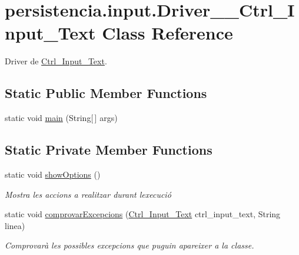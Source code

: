 \hypertarget{classpersistencia_1_1input_1_1Driver____Ctrl__Input__Text}{}\section{persistencia.\+input.\+Driver\+\_\+\+\_\+\+Ctrl\+\_\+\+Input\+\_\+\+Text Class Reference}
\label{classpersistencia_1_1input_1_1Driver____Ctrl__Input__Text}


Driver de \hyperlink{classpersistencia_1_1input_1_1Ctrl__Input__Text}{Ctrl\+\_\+\+Input\+\_\+\+Text}.  


\subsection*{Static Public Member Functions}
\begin{DoxyCompactItemize}
\item 
static void \hyperlink{classpersistencia_1_1input_1_1Driver____Ctrl__Input__Text_a38cebd4cadb9198cb6a2c87147646ec0}{main} (String\mbox{[}$\,$\mbox{]} args)
\end{DoxyCompactItemize}
\subsection*{Static Private Member Functions}
\begin{DoxyCompactItemize}
\item 
static void \hyperlink{classpersistencia_1_1input_1_1Driver____Ctrl__Input__Text_a51d02aa85468b0924d13e4060106459e}{show\+Options} ()
\begin{DoxyCompactList}\small\item\em Mostra les accions a realitzar durant l\textquotesingle{}execució \end{DoxyCompactList}\item 
static void \hyperlink{classpersistencia_1_1input_1_1Driver____Ctrl__Input__Text_a3e4149adb11b97b330ce77f1c2b5ae9c}{comprovar\+Excepcions} (\hyperlink{classpersistencia_1_1input_1_1Ctrl__Input__Text}{Ctrl\+\_\+\+Input\+\_\+\+Text} ctrl\+\_\+input\+\_\+text, String linea)
\begin{DoxyCompactList}\small\item\em Comprovarà les possibles excepcions que puguin apareixer a la classe. \end{DoxyCompactList}\end{DoxyCompactItemize}


